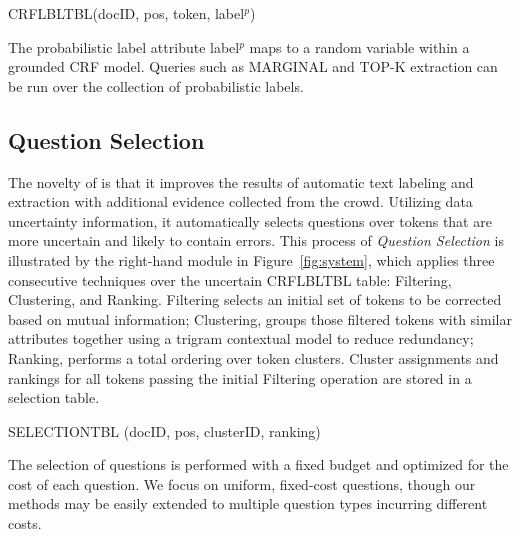 \vspace{.1in} \centerline{C{\small RF}L{\small BL}T{\small BL}(docID, pos, token, label$^{p}$)} \vspace{.1in}

The probabilistic label attribute label$^{p}$ maps to a random variable within a grounded CRF model.  Queries such as MARGINAL and TOP-K extraction can be run over the collection of probabilistic labels.

\subsection{Question Selection}

The novelty of \sysName is that it improves the results of automatic text labeling and extraction with additional evidence collected from the crowd.  Utilizing data uncertainty information, it automatically selects questions over tokens that are more uncertain and likely to contain errors. This process of \textit{Question Selection} is illustrated by the right-hand module in Figure~\ref{fig:system}, which applies three consecutive techniques over the uncertain C{\small RF}L{\small BL}T{\small BL} table: Filtering, Clustering, and Ranking. Filtering selects an initial set of tokens to be corrected based on mutual information; Clustering, groups those filtered tokens with similar attributes together using a trigram contextual model to reduce redundancy; Ranking, performs a total ordering over token clusters.  Cluster assignments and rankings for all tokens passing the initial Filtering operation are stored in a selection table.

\vspace{.1in} \centerline{S{\small ELECTION}T{\small BL} (docID, pos, clusterID, ranking)} \vspace{.1in}

The selection of questions is performed with a fixed budget and optimized for the cost of each question.
We focus on uniform, fixed-cost questions, though our methods may be easily extended to multiple question types incurring different costs.




